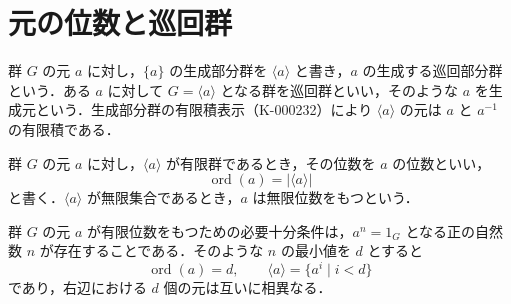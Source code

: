 \section{元の位数と巡回群}
\begin{defn}[巡回部分群と巡回群]
群 $G$ の元 $a$ に対し，$\{a\}$ の生成部分群を $\langle a\rangle$ と書き，$a$ の生成する巡回部分群という．ある $a$ に対して $G=\langle a\rangle$ となる群を巡回群といい，そのような $a$ を生成元という．生成部分群の有限積表示（K-000232）により $\langle a\rangle$ の元は $a$ と $a^{-1}$ の有限積である．
\end{defn}
\begin{defn}[元の位数]
群 $G$ の元 $a$ に対し，$\langle a\rangle$ が有限群であるとき，その位数を $a$ の位数といい，
\[
\operatorname{ord}(a)=|\langle a\rangle|
\]
と書く．$\langle a\rangle$ が無限集合であるとき，$a$ は無限位数をもつという．
\end{defn}
\begin{thm}[有限位数と最小正指数]
群 $G$ の元 $a$ が有限位数をもつための必要十分条件は，$a^n=1_G$ となる正の自然数 $n$ が存在することである．そのような $n$ の最小値を $d$ とすると
\[
\operatorname{ord}(a)=d,\qquad \langle a\rangle=\{a^i\mid i<d\}
\]
であり，右辺における $d$ 個の元は互いに相異なる．
\end{thm}
